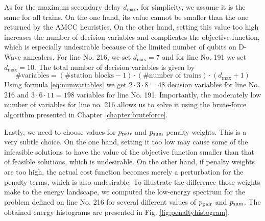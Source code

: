 As for the maximum secondary delay $d_{\max}$, for simplicity, we assume it is
    the same for all trains. On the one hand, its value cannot be smaller than the
    one returned by the AMCC heuristics. On the other hand, setting this value too
    high increases the number of decision variables and complicates the objective
    function, which is especially undesirable because of the limited number of
    qubits on D-Wave annealers. For line No. 216, we set $d_{\max}=7$ and for line
    No. 191 we set $d_{\max}=10$. The total number of decision variables is given
    by
    \begin{equation}
      \label{eq:numvariables}
      \mbox{\#variables} = (\mbox{\#station blocks}-1) \cdot (\mbox{\#number of trains}) \cdot (d_{\max}+1)
    \end{equation}
    Using formula \eqref{eq:numvariables} we get $2\cdot 3 \cdot 8 = 48$ decision variables for line No. 216
    and $3 \cdot 6 \cdot 11 = 198$ variables for line No. 191. Importantly, the
moderately low number of variables for line no. 216 allows us to solve it using
the brute-force algorithm presented in Chapter \ref{chapter:bruteforce}.

Lastly, we need to choose values for $p_{\text{pair}}$ and $p_{\text{sum}}$ penalty weights.
    This is a very subtle choice. On the one hand, setting it too low may cause
    some of the infeasible solutions to have the value of the objective function
    smaller than that of feasible solutions, which is undesirable. On the other
    hand, if penalty weights are too high, the actual cost function becomes merely
    a perturbation for the penalty terms, which is also undesirable. To illustrate
    the difference those weights make to the energy landscape, we computed the
    low-energy spectrum for the problem defined on line No. 216 for several
    different values of $p_{\text{pair}}$ and $p_{\text{sum}}$. The obtained energy histograms
    are presented in Fig. \ref{fig:penaltyhistogram}.

